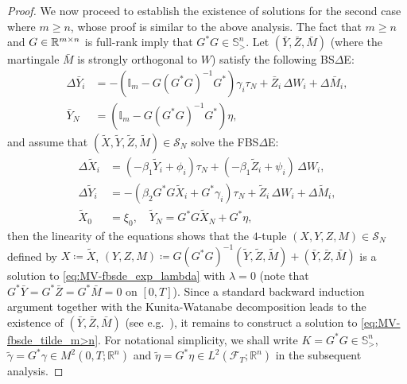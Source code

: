 \documentclass[11pt]{article}
\numberwithin{equation}{section}
\theoremstyle{definition}
\theoremstyle{remark}
\newcommand{\q}{\quad}   \newcommand{\qq}{\qquad}
\def\l{\label}  \def\f{\frac}  \def\fa{\forall}
\def\b{\beta}  \def\a{\alpha} \def\ga{\gamma}
\def\cF{\mathcal{F}}
\def\cS{\mathcal{S}}
\def\sI{{\mathbb{I}}}
\def\sR{{\mathbb R}}
\def\sS{{\mathbb{S}}}
\begin{document}
\begin{proof}
We now proceed to establish the existence of solutions for the second case where $m\ge n$, whose proof is similar to the above analysis.
The fact that $m\ge n$ and  $G\in \sR^{m\t n}$ is full-rank imply that $G^*G\in \sS^n_>$.
%
%
Let 
$(\bar{Y},\bar{Z},\bar{M})$  (where the martingale $\bar{M}$ is strongly orthogonal to $W$)  satisfy the following  
BS$\Delta$E:
\begin{align*}
\Delta \bar{Y}_i&=-(\sI_m-G(G^*G)^{-1}G^*)\gamma_i\tau_N+\bar{Z}_i\,\Delta W_i+\Delta \bar{M}_i,
\\
 \bar{Y}_N&=(\sI_m-G(G^*G)^{-1}G^*)\eta,
\end{align*}
and assume that  $(\tilde{X},\tilde{Y},\tilde{Z},\tilde{M})\in \cS_N$ 
solve the FBS$\Delta$E:
\begin{subequations}\label{eq:MV-fbsde_tilde_m>n}
\begin{align}
\Delta \tilde{X}_i&=(-\b_1 \tilde{Y}_{i}+\phi_{i})\tau_N  +(-\b_1 \tilde{Z}_i+\psi_i)\, \Delta W_i, 
\l{eq:fbsde_fwd_tilde_m>n}\\
\Delta \tilde{Y}_i&=-(\b_2G^*G\tilde{X}_i+G^*\gamma_i)\tau_N+\tilde{Z}_i\,\Delta W_i+\Delta \tilde{M}_i,
\l{eq:fbsde_bwd_tilde_m>n}\\
\tilde{X}_0&=\xi_0,\q \tilde{Y}_N=G^*G\tilde{X}_N+G^*\eta,
\l{eq:fbsde_terminal_tilde_m>n}
\end{align}
\end{subequations}
then
the linearity of the equations shows that 
 the $4$-tuple   $(X,Y, Z, M)\in \cS_N$ defined by $X\coloneqq \tilde{X}$, $(Y, Z, M)\coloneqq G(G^*G)^{-1}(\tilde{Y},\tilde{Z},\tilde{M})+(\bar{Y},\bar{Z},\bar{M})$ is a solution to 
\eqref{eq:MV-fbsde_exp_lambda} with $\lambda=0$
(note that $G^*\bar{Y}=G^*\bar{Z}=G^*\bar{M} =0$
 on $[0,T]$).
 Since a standard  backward induction argument together with the Kunita-Watanabe decomposition 
leads to  the  existence of  $(\bar{Y},\bar{Z},\bar{M})$ (see e.g.~\cite[Theorem 2.2]{bielecki2015}),
it remains to construct a solution to \eqref{eq:MV-fbsde_tilde_m>n}.
For notational simplicity, we shall write $K=G^*G\in \sS^n_>$, $\tilde{\gamma}=G^*\gamma\in M^2(0,T;\sR^n)$ and $\tilde{\eta}=G^*\eta\in L^2(\cF_T;\sR^n)$ in the subsequent analysis.


\end{proof}
\end{document}
